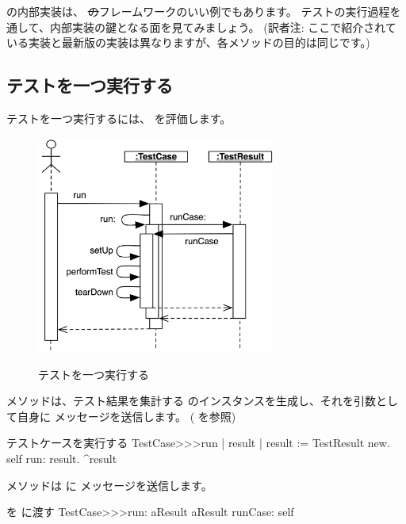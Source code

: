 \documentclass[a4paper,10pt,twoside]{book}
\begin{document}
\sunit の内部実装は、 \st のフレームワークのいい例でもあります。
テストの実行過程を通して、内部実装の鍵となる面を見てみましょう。
(訳者注: ここで紹介されている実装と最新版の実装は異なりますが、各メソッドの目的は同じです。)

\subsection{テストを一つ実行する}

テストを一つ実行するには、  を評価します。

\begin{figure}[tbh]
  \begin{center}
		{\includegraphics[width=0.7\textwidth]{sunit-scenario}}
	\caption{テストを一つ実行する}
  \end{center}
\end{figure}

 メソッドは、テスト結果を集計する  のインスタンスを生成し、それを引数として自身に  メッセージを送信します。
( を参照)

\begin{method}[tastecaserun]{テストケースを実行する}
TestCase>>>run
	| result |
	result := TestResult new.
	self run: result.
	^result
\end{method}

 メソッドは  に  メッセージを送信します。

\begin{method}[testcaserun:]{ を  に渡す}
TestCase>>>run: aResult
	aResult runCase: self
\end{method}
\end{document}
